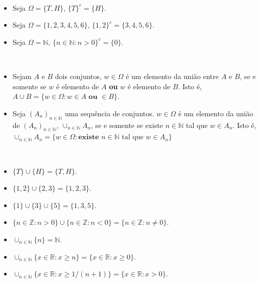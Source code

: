   \begin{example}[$^{c}$] \
    \begin{itemize}
      \item Seja $\Omega = \{T,H\}$, $\{T\}^{c} = \{H\}$.
      \item Seja $\Omega = \{1,2,3,4,5,6\}$, $\{1,2\}^{c} = \{3,4,5,6\}$.
      \item Seja $\Omega = \mathbb{N}$, $\{n \in \mathbb{N}: n > 0\}^{c} = \{0\}$.
    \end{itemize}
  \end{example}

  \begin{definition} \
    \label{union}
    \begin{itemize}
      \item Sejam $A$ e $B$ dois conjuntos, 
			 $w \in \Omega$ é um elemento da união entre $A$ e $B$, se e somente se
			 $w$ é elemento de $A$ \textbf{ou} $w$ é elemento de $B$. 
			 Isto é, $A \cup B = \{w \in \Omega: w \in A \textbf{ ou } \in B\}$. 
      \item Seja $(A_{n})_{n \in \mathbb{N}}$ uma sequência de conjuntos. 
			 $w \in \Omega$ é um elemento da união de $(A_{n})_{n \in \mathbb{N}}$, $\cup_{n \in \mathbb{N}}{A_{n}}$,
			 se e somente se existe $n \in \mathbb{N}$ tal que $w \in A_{n}$. 
			 Isto é, $\cup_{n \in \mathbb{N}}{A_{n}} = \{w \in \Omega: \textbf{existe } n \in \mathbb{N} \text{ tal que } w \in A_{n}\}$
    \end{itemize}
  \end{definition}

  \begin{example}[$\cup$] \
    \begin{itemize}
      \item $\{T\} \cup \{H\} = \{T,H\}$.
      \item $\{1,2\} \cup \{2,3\} = \{1,2,3\}$.
      \item $\{1\} \cup \{3\} \cup \{5\} = \{1,3,5\}$.
      \item $\{n \in \mathbb{Z}: n > 0\} \cup \{n \in \mathbb{Z}: n < 0\} = \{n \in \mathbb{Z}: n \neq 0\}$.
      \item $\cup_{n \in \mathbb{N}}{\{n\}} = \mathbb{N}$.
      \item $\cup_{n \in \mathbb{N}}{\{x \in \mathbb{R}: x \geq n\}} = \{x \in \mathbb{R}: x \geq 0\}$.
      \item $\cup_{n \in \mathbb{N}}{\{x \in \mathbb{R}: x \geq 1/(n+1)\}} = \{x \in \mathbb{R}: x > 0\}$.
    \end{itemize}
  \end{example}

